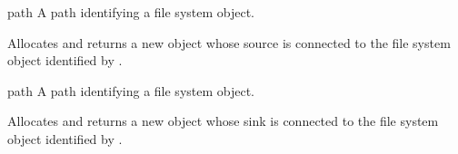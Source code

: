 \begin{optDefinition}

\begin{arguments}
    \item[path] A path identifying a file system object.
\end{arguments}
%
\result%
Allocates and returns a new  object whose source
is connected to the file system object identified by .

\begin{arguments}
    \item[path] A path identifying a file system object.
\end{arguments}
%
\result%
Allocates and returns a new  object whose sink is
connected to the file system object identified by .

\Syntax
{}%

\Syntax
{}%


\end{optDefinition}
